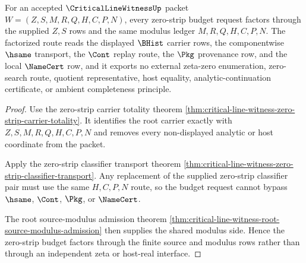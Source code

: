 \begin{theorem}
\label{thm:critical-line-witness-zero-strip-budget-factorization}
For an accepted $\CriticalLineWitnessUp$ packet $W=(Z,S,M,R,Q,H,C,P,N)$, every zero-strip budget request factors through the supplied $Z,S$ rows and the same modulus ledger $M,R,Q,H,C,P,N$. The factorized route reads the displayed $\BHist$ carrier rows, the componentwise $\hsame$ transport, the $\Cont$ replay route, the $\Pkg$ provenance row, and the local $\NameCert$ row, and it exports no external zeta-zero enumeration, zero-search route, quotient representative, host equality, analytic-continuation certificate, or ambient completeness principle.
\end{theorem}
\begin{proof}
Use the zero-strip carrier totality theorem \autoref{thm:critical-line-witness-zero-strip-carrier-totality}. It identifies the root carrier exactly with $Z,S,M,R,Q,H,C,P,N$ and removes every non-displayed analytic or host coordinate from the packet.

Apply the zero-strip classifier transport theorem \autoref{thm:critical-line-witness-zero-strip-classifier-transport}. Any replacement of the supplied zero-strip classifier pair must use the same $H,C,P,N$ route, so the budget request cannot bypass $\hsame$, $\Cont$, $\Pkg$, or $\NameCert$.

The root source-modulus admission theorem \autoref{thm:critical-line-witness-root-source-modulus-admission} then supplies the shared modulus side. Hence the zero-strip budget factors through the finite source and modulus rows rather than through an independent zeta or host-real interface.
\end{proof}

